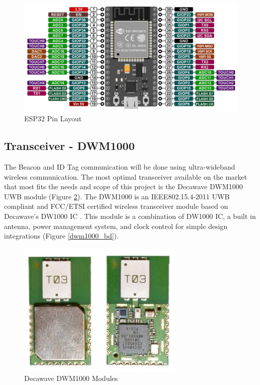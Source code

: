 \medskip
\begin{figure}[H]
\centering
    \includegraphics[scale=0.5]{./images/esp32_pin.png}
    \caption{ESP32 Pin Layout}
    \label{esp_pin}
\end{figure}


\pagebreak
\subsection{Transceiver - DWM1000} 
\medskip
The Beacon and ID Tag communication will be done using ultra-wideband wireless communication. The most optimal transceiver available on the market that most fits the needs and scope of this project is the Decawave DWM1000 UWB module (Figure \ref{dwm1000}). The DWM1000 is an IEEE802.15.4-2011 UWB compliant and FCC/ETSI certified wireless transceiver module based on Decawave’s DW1000 IC \cite{R4-2-1}. This module is a combination of DW1000 IC, a built in antenna, power management system, and clock control for simple design integrations (Figure \ref{dwm1000_bd}). 

\medskip
\begin{figure}[H]
\centering
    \includegraphics[scale=0.75]{./images/dwm1000.jpg}
    \caption{Decawave DWM1000 Modules}
    \label{dwm1000}
\end{figure}

